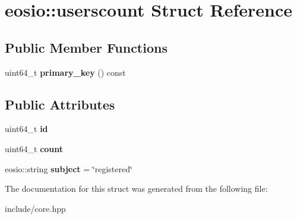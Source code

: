 \hypertarget{structeosio_1_1userscount}{}\section{eosio\+:\+:userscount Struct Reference}
\label{structeosio_1_1userscount}
\subsection*{Public Member Functions}
\begin{DoxyCompactItemize}
\item 
\mbox{\label{structeosio_1_1userscount_ae4d9aea2764eaefc2e1af7826bff3f5f}} 
uint64\+\_\+t {\bfseries primary\+\_\+key} () const
\end{DoxyCompactItemize}
\subsection*{Public Attributes}
\begin{DoxyCompactItemize}
\item 
\mbox{\label{structeosio_1_1userscount_a794af90f5004ea4c4e2b077e403261f6}} 
uint64\+\_\+t {\bfseries id}
\item 
\mbox{\label{structeosio_1_1userscount_a7ee8d24c47af11e15995bb2ce734034c}} 
uint64\+\_\+t {\bfseries count}
\item 
\mbox{\label{structeosio_1_1userscount_a912cb66b5638a7c75c8677744501921f}} 
eosio\+::string {\bfseries subject} = \char`\"{}registered\char`\"{}
\end{DoxyCompactItemize}


The documentation for this struct was generated from the following file\+:\begin{DoxyCompactItemize}
\item 
include/core.\+hpp\end{DoxyCompactItemize}
